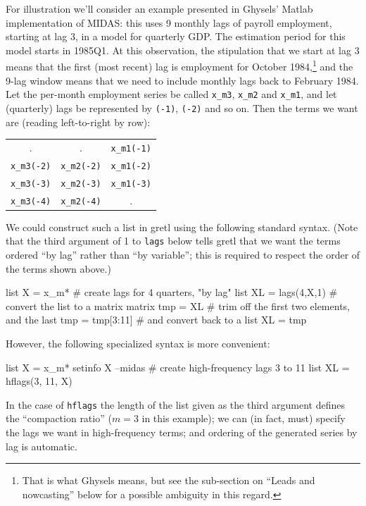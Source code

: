 \documentclass{article}
\begin{document}
For illustration we'll consider an example presented in Ghysels'
\textsf{Matlab} implementation of MIDAS: this uses 9 monthly lags of
payroll employment, starting at lag 3, in a model for quarterly GDP.
The estimation period for this model starts in 1985Q1. At this
observation, the stipulation that we start at lag 3 means that the
first (most recent) lag is employment for October 1984,\footnote{That
  is what Ghysels means, but see the sub-section on ``Leads and
  nowcasting'' below for a possible ambiguity in this regard.} and the
9-lag window means that we need to include monthly lags back to
February 1984. Let the per-month employment series be called
\texttt{x\_m3}, \texttt{x\_m2} and \texttt{x\_m1}, and let (quarterly)
lags be represented by \texttt{(-1)}, \texttt{(-2)} and so on. Then
the terms we want are (reading left-to-right by row):
\begin{center}
{\small
\begin{tabular}{ccc}
 . & . & \texttt{x\_m1(-1)} \\
\texttt{x\_m3(-2)} & \texttt{x\_m2(-2)} & \texttt{x\_m1(-2)} \\
\texttt{x\_m3(-3)} & \texttt{x\_m2(-3)} & \texttt{x\_m1(-3)} \\
\texttt{x\_m3(-4)} & \texttt{x\_m2(-4)} & .
\end{tabular}
}
\end{center}

We could construct such a list in gretl using the following
standard syntax. (Note that the third argument of 1 to
\texttt{lags} below tells gretl that we want the terms ordered ``by
lag'' rather than ``by variable''; this is required to respect the
order of the terms shown above.)
\begin{code}
list X = x_m*
# create lags for 4 quarters, "by lag"
list XL = lags(4,X,1)
# convert the list to a matrix
matrix tmp = XL
# trim off the first two elements, and the last
tmp = tmp[3:11]
# and convert back to a list
XL = tmp
\end{code}

However, the following specialized syntax is more convenient:
\begin{code}
list X = x_m*
setinfo X --midas
# create high-frequency lags 3 to 11
list XL = hflags(3, 11, X)
\end{code}

In the case of \texttt{hflags} the length of the list given as the
third argument defines the ``compaction ratio'' ($m=3$ in this
example); we can (in fact, must) specify the lags we want in
high-frequency terms; and ordering of the generated series by lag is
automatic. 
\end{document}

